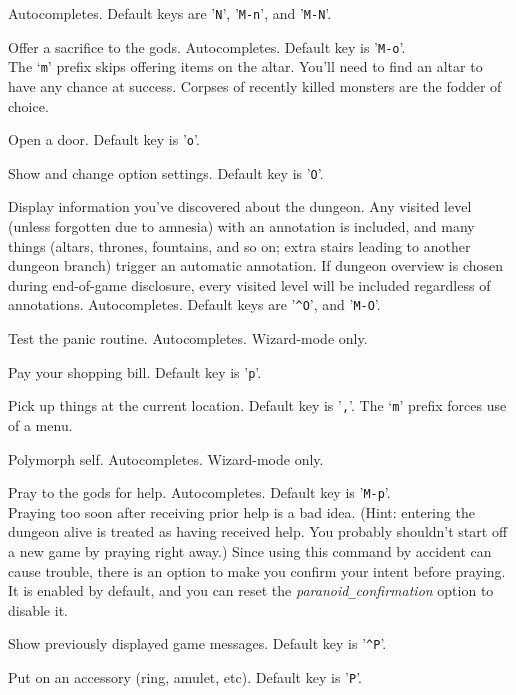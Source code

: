 Autocompletes. Default keys are '{\tt N}', '{\tt M-n}', and '{\tt M-N}'.
\item[\tb{\#offer}]
Offer a sacrifice to the gods. Autocompletes. Default key is '{\tt M-o}'.\\
The `{\tt m}' prefix skips offering items on the altar.
You'll need to find an altar to have any chance at success.
Corpses of recently killed monsters are the fodder of choice.
\item[\tb{\#open}]
Open a door. Default key is '{\tt o}'.
\item[\tb{\#options}]
Show and change option settings. Default key is '{\tt O}'.
\item[\tb{\#overview}]
Display information you've discovered about the dungeon.  Any visited
level (unless forgotten due to amnesia) with an annotation is included,
and many things (altars, thrones, fountains, and so on; extra stairs
leading to another dungeon branch) trigger an automatic annotation.
If dungeon overview is chosen during end-of-game disclosure, every visited
level will be included regardless of annotations. Autocompletes.
Default keys are '{\tt \^{}O}', and '{\tt M-O}'.
\item[\tb{\#panic}]
Test the panic routine. Autocompletes. Wizard-mode only.
\item[\tb{\#pay}]
Pay your shopping bill. Default key is '{\tt p}'.
\item[\tb{\#pickup}]
Pick up things at the current location. Default key is '{\tt ,}'.
The `{\tt m}' prefix forces use of a menu.
\item[\tb{\#polyself}]
Polymorph self. Autocompletes. Wizard-mode only.
\item[\tb{\#pray}]
Pray to the gods for help. Autocompletes. Default key is '{\tt M-p}'.\\
Praying too soon after receiving prior help is a bad idea.
(Hint: entering the dungeon alive is treated as having received help.
You probably shouldn't start off a new game by praying right away.)
Since using this command by accident can cause trouble, there is an
option to make you confirm your intent before praying.  It is enabled
by default, and you can reset the
{\it paranoid\verb+_+confirmation\/}
option to disable it.
\item[\tb{\#prevmsg}]
Show previously displayed game messages. Default key is '{\tt \^{}P}'.
\item[\tb{\#puton}]
Put on an accessory (ring, amulet, etc). Default key is '{\tt P}'.
